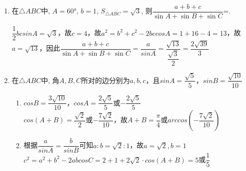 \begin{enumerate}
\begin{enumerate}
    \item 在$\triangle{ABC}$中, $A=\ang{60}$, $b=1$, $S_{\triangle{ABC}}=\sqrt{3}$, 则$\dfrac{a+b+c}{\sin{A}+\sin{B}+\sin{C}}$=. 
    \begin{jieda}
        $\dfrac{1}{2}bcsinA = \sqrt{3}$，故$c = 4$，故$a^2 = b^2+c^2-2bccosA = 1 + 16 - 4 = 13$，故$a = \sqrt{13}$，因此$\dfrac{a+b+c}{\sin{A}+\sin{B}+\sin{C}} = \dfrac{a}{sinA} = \dfrac{\sqrt{13}}{\dfrac{\sqrt{3}}{2}} = \dfrac{2\sqrt{39}}{3}$
    \end{jieda}
    \item 在$\triangle{ABC}$中, 角$A, B, C$所对的边分别为$a, b, c$，且$sinA = \dfrac{\sqrt{5}}{5}$，$sinB = \dfrac{\sqrt{10}}{10}$
    \begin{jieda}
        \begin{enumerate}
            \item $cosB = \dfrac{3\sqrt{10}}{10}$，$cosA = \dfrac{2\sqrt{5}}{5}$或$-\dfrac{2\sqrt{5}}{5}$ \\
            $cos(A+B) = \dfrac{\sqrt{2}}{2}$或$-\dfrac{7\sqrt{2}}{10}$，故$A+B = \dfrac{\pi}{4}$或$arccos(-\dfrac{7\sqrt{2}}{10})$
            \item 根据$\dfrac{a}{sinA} = \dfrac{b}{sinB}$可知$a:b = \sqrt{2}:1$，故$a = \sqrt{2}, b = 1$ \\
            $c^2 = a^2+b^2-2abcosC = 2+1+2\sqrt{2}\cdot cos(A+B) = 5$或$\dfrac{1}{5}$
        \end{enumerate}
    \end{jieda}
\end{enumerate}
    

\end{enumerate}
